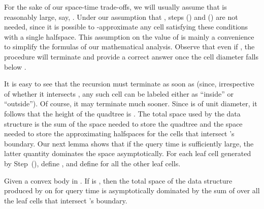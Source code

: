 \documentclass[11pt]{article}   \usepackage[letterpaper,hmargin=2.1cm,vmargin=3cm]{geometry}
\begin{document}
For the sake of our space-time trade-offs, we will usually assume that  is reasonably large, say, . Under our assumption that , steps (\stepout) and (\stepin) are not needed, since it is possible to -approximate any cell satisfying these conditions with a single halfspace. This assumption on the value of  is mainly a convenience to simplify the formulas of our mathematical analysis. Observe that even if , the procedure will terminate and provide a correct answer once the cell diameter falls below .

It is easy to see that the recursion must terminate as soon as  (since, irrespective of whether it intersects , any such cell can be labeled either as ``inside'' or ``outside''). Of course, it may terminate much sooner. Since  is of unit diameter, it follows that the height of the quadtree is . The total space used by the data structure is the sum of the space needed to store the quadtree and the space needed to store the approximating halfspaces for the cells that intersect 's boundary. Our next lemma shows that if the query time is sufficiently large, the latter quantity dominates the space asymptotically. For each leaf cell  generated by Step~(\stepapx), define , and define  for all the other leaf cells.

\begin{lemma} \label{lem:total-space}
Given a convex body  in . If  is , then the total space of the data structure produced by  on  for query time  is asymptotically dominated by the sum of  over all the leaf cells  that intersect 's boundary.
\end{lemma}
\end{document}

